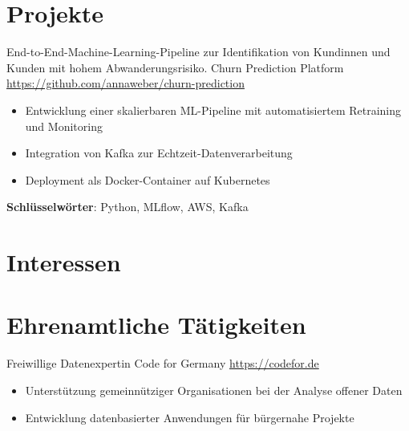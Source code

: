 \documentclass[a4paper, serif, 10pt]{moderncv}
\begin{document}
\section{Projekte}

        {End-to-End-Machine-Learning-Pipeline zur Identifikation von Kundinnen und Kunden mit hohem Abwanderungsrisiko.}
        {Churn Prediction Platform}
        {\url{https://github.com/annaweber/churn-prediction}}
        {}
        {\begin{itemize}
\item Entwicklung einer skalierbaren ML-Pipeline mit automatisiertem Retraining und Monitoring
\item Integration von Kafka zur Echtzeit-Datenverarbeitung
\item Deployment als Docker-Container auf Kubernetes
\end{itemize}
\textbf{Schlüsselwörter}: Python, MLflow, AWS, Kafka}
\section{Interessen}

\section{Ehrenamtliche Tätigkeiten}

        {Freiwillige Datenexpertin}
        {Code for Germany}
        {\url{https://codefor.de}}
        {}
        {\begin{itemize}
\item Unterstützung gemeinnütziger Organisationen bei der Analyse offener Daten
\item Entwicklung datenbasierter Anwendungen für bürgernahe Projekte
\end{itemize}}
    
\end{document}
